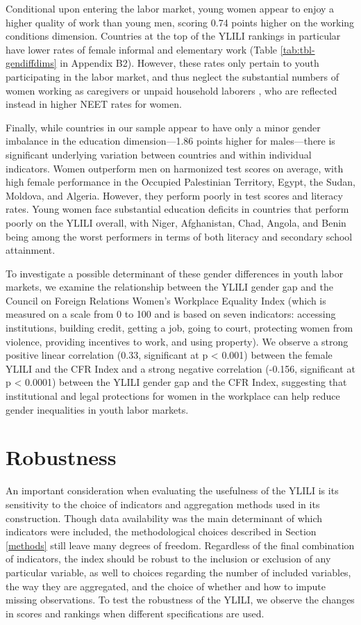 \documentclass[
  a4paper, twoside, 12pt]{book}
\begin{document}
Conditional upon entering the labor market, young women appear to enjoy a higher quality of work than young men, scoring 0.74 points higher on the working conditions dimension. Countries at the top of the YLILI rankings in particular have lower rates of female informal and elementary work (Table \ref{tab:tbl-gendiffdims} in Appendix B2). However, these rates only pertain to youth participating in the labor market, and thus neglect the substantial numbers of women working as caregivers or unpaid household laborers \autocite{ilo2023b}, who are reflected instead in higher NEET rates for women.

Finally, while countries in our sample appear to have only a minor gender imbalance in the education dimension---1.86 points higher for males---there is significant underlying variation between countries and within individual indicators. Women outperform men on harmonized test scores on average, with high female performance in the Occupied Palestinian Territory, Egypt, the Sudan, Moldova, and Algeria. However, they perform poorly in test scores and literacy rates. Young women face substantial education deficits in countries that perform poorly on the YLILI overall, with Niger, Afghanistan, Chad, Angola, and Benin being among the worst performers in terms of both literacy and secondary school attainment.

To investigate a possible determinant of these gender differences in youth labor markets, we examine the relationship between the YLILI gender gap and the Council on Foreign Relations Women's Workplace Equality Index (which is measured on a scale from 0 to 100 and is based on seven indicators: accessing institutions, building credit, getting a job, going to court, protecting women from violence, providing incentives to work, and using property). We observe a strong positive linear correlation (0.33, significant at p \textless{} 0.001) between the female YLILI and the CFR Index and a strong negative correlation (-0.156, significant at p \textless{} 0.0001) between the YLILI gender gap and the CFR Index, suggesting that institutional and legal protections for women in the workplace can help reduce gender inequalities in youth labor markets.

\hypertarget{robustness}{%
\section{Robustness}\label{robustness}}

An important consideration when evaluating the usefulness of the YLILI is its sensitivity to the choice of indicators and aggregation methods used in its construction. Though data availability was the main determinant of which indicators were included, the methodological choices described in Section \ref{methods} still leave many degrees of freedom. Regardless of the final combination of indicators, the index should be robust to the inclusion or exclusion of any particular variable, as well to choices regarding the number of included variables, the way they are aggregated, and the choice of whether and how to impute missing observations. To test the robustness of the YLILI, we observe the changes in scores and rankings when different specifications are used.
\end{document}
